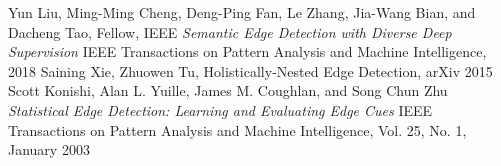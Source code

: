 \documentclass{beamer}
\begin{document}
	\begin{thebibliography}{9}		
		Yun Liu, Ming-Ming Cheng, Deng-Ping Fan, Le Zhang, Jia-Wang Bian, and Dacheng Tao, Fellow, IEEE
		\textit{Semantic Edge Detection with Diverse Deep Supervision} 
		IEEE Transactions on Pattern Analysis and Machine Intelligence, 2018
		Saining Xie, Zhuowen Tu, Holistically-Nested Edge Detection, arXiv 2015
		Scott Konishi, Alan L. Yuille, James M. Coughlan, and Song Chun Zhu
		\textit{Statistical Edge Detection: Learning and Evaluating Edge Cues}
		IEEE Transactions on Pattern Analysis and Machine Intelligence, Vol. 25, No. 1, January 2003

	\end{thebibliography}
\end{document}
